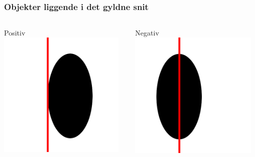 \documentclass{beamer}
\begin{document}
\subsection*{}
\begin{frame}

    \frametitle{Objekter liggende i det gyldne snit}

    \begin{columns}[t]
        \begin{exampleblock}{Positiv}
            \includegraphics[width=0.95\textwidth]{pnaiv_nudvidet}
        \end{exampleblock}
        \begin{exampleblock}{Negativ}
            \includegraphics[width=0.95\textwidth]{pudvidet_nnaiv}
        \end{exampleblock}
    \end{columns}


\end{frame}
\end{document}
